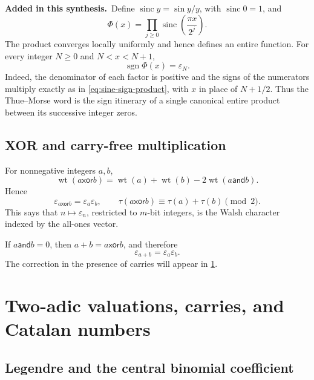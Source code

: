 \documentclass[11pt,oneside]{article}
\numberwithin{equation}{section}
\theoremstyle{definition}
\theoremstyle{remark}
\newcommand{\wt}{\operatorname{wt}}
\newcommand{\eps}{\varepsilon}
\newcommand{\TM}{\tau}
\newcommand{\xor}{\mathbin{\mathsf{xor}}}
\newcommand{\bitand}{\mathbin{\mathsf{and}}}
\newcommand{\sinc}{\operatorname{sinc}}
\newcommand{\newmaterial}{\textcolor{AtlasBlue}{\textbf{Added in this synthesis.}}\ }
\begin{document}
\newmaterial Define \(\sinc y=\sin y/y\), with \(\sinc0=1\), and
\begin{equation}
 \Phi(x)=\prod_{j\ge0}\sinc\!\left(\frac{\pi x}{2^j}\right).
 \label{eq:Phi-sinc}
\end{equation}
The product converges locally uniformly and hence defines an entire function.
For every integer \(N\ge0\) and \(N<x<N+1\),
\begin{equation}
 \boxed{\operatorname{sgn}\Phi(x)=\eps_N.}
 \label{eq:sinc-sign}
\end{equation}
Indeed, the denominator of each factor is positive and the signs of the
numerators multiply exactly as in \eqref{eq:sine-sign-product}, with \(x\)
in place of \(N+1/2\).  Thus the Thue--Morse word is the sign itinerary of a
single canonical entire product between its successive integer zeros.

\subsection{XOR and carry-free multiplication}

For nonnegative integers \(a,b\),
\begin{equation}
 \wt(a\xor b)=\wt(a)+\wt(b)-2\wt(a\bitand b).
 \label{eq:xor-weight}
\end{equation}
Hence
\begin{equation}
 \boxed{\eps_{a\xor b}=\eps_a\eps_b,\qquad
 \TM(a\xor b)\equiv\TM(a)+\TM(b)\pmod2.}
 \label{eq:xor-character}
\end{equation}
This says that \(n\mapsto\eps_n\), restricted to \(m\)-bit integers, is the
Walsh character indexed by the all-ones vector.

If \(a\bitand b=0\), then \(a+b=a\xor b\), and therefore
\begin{equation}
 \eps_{a+b}=\eps_a\eps_b.
 \label{eq:carry-free-addition}
\end{equation}
The correction in the presence of carries will appear in
\cref{sec:valuations}.

\section{Two-adic valuations, carries, and Catalan numbers}
\label{sec:valuations}

\subsection{Legendre and the central binomial coefficient}
\end{document}
